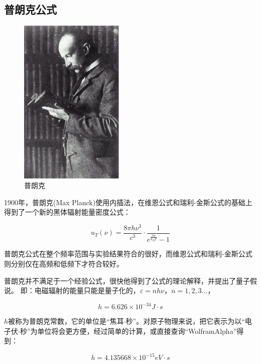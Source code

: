\subsection{普朗克公式}

\begin{figure}[h]
\begin{center}
\includegraphics[width=5cm]{Duality/planck.ps}
\caption{普朗克}
\end{center}
\end{figure}

1900年，普朗克(Max Planck)使用内插法，在维恩公式和瑞利-金斯公式的基础上得到了一个新的黑体辐射能量密度公式：


\begin{equation}\label{planck's law}
u_T (\nu ) = \frac{{8\pi h\nu ^3 }}{{c^3 }} \cdot \frac{1}{{e^{\frac{{h\nu }}{{k_B T}}}  - 1}}
\end{equation}

普朗克公式在整个频率范围与实验结果符合的很好，而维恩公式和瑞利-金斯公式则分别仅在高频和低频下才符合较好。

普朗克并不满足于一个经验公式，很快他得到了公式的理论解释，并提出了量子假说。
即：电磁辐射的能量只能是量子化的，$\varepsilon  = nh\nu $，$n=1,2,3...$，

\begin{equation}
h = 6.626 \times 10^{ - 34} J \cdot s
\end{equation}

$h$被称为普朗克常数，它的单位是“焦耳$\cdot$秒”。对原子物理来说，把它表示为以“电子伏$\cdot$秒”为单位将会更方便，经过简单的计算，或直接查询“WolframAlpha”得到：

\begin{equation}
h = 4.135668 \times 10^{-15} eV \cdot s
\end{equation}

